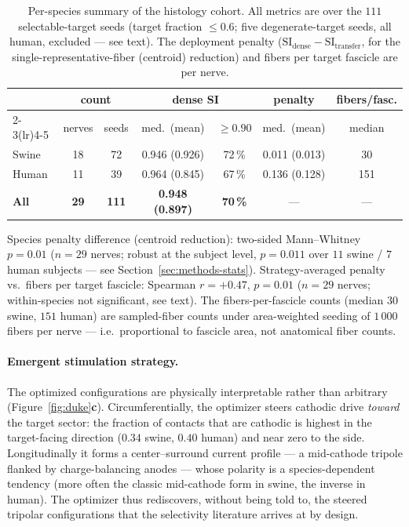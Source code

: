 \begin{table}[h]
  \centering
  \small
  \caption{Per-species summary of the histology cohort.  All metrics
    are over the $111$ selectable-target seeds (target fraction
    $\le 0.6$; five degenerate-target seeds, all human, excluded --- see
    text).  The deployment penalty
    ($\mathrm{SI_{dense}} - \mathrm{SI_{transfer}}$, for the
    single-representative-fiber (centroid) reduction) and fibers per
    target fascicle are per nerve.}
  \label{tab:duke-cohort}
  \setlength{\tabcolsep}{5pt}
  \begin{tabular}{lcccccc}
    \toprule
    & \multicolumn{2}{c}{count} & \multicolumn{2}{c}{dense SI}
    & penalty & fibers/fasc. \\
    \cmidrule(lr){2-3}\cmidrule(lr){4-5}
    & nerves & seeds & med.\ (mean) & $\ge0.90$ & med.\ (mean) & median \\
    \midrule
    Swine        & 18 &  72 & 0.946 (0.926) & 72\,\% & 0.011 (0.013) & 30 \\
    Human        & 11 &  39 & 0.964 (0.845) & 67\,\% & 0.136 (0.128) & 151 \\
    \midrule
    \textbf{All} & \textbf{29} & \textbf{111} & \textbf{0.948 (0.897)}
                 & \textbf{70\,\%} & --- & --- \\
    \bottomrule
  \end{tabular}

  \vspace{2pt}
  {\footnotesize Species penalty difference (centroid reduction):
   two-sided Mann--Whitney $p = 0.01$ ($n = 29$ nerves; robust at the
   subject level, $p = 0.011$ over $11$ swine / $7$ human subjects ---
   see Section~\ref{sec:methods-stats}).  Strategy-averaged penalty vs.\
   fibers per target fascicle: Spearman $r = +0.47$, $p = 0.01$
   ($n = 29$ nerves; within-species not significant, see text).  The
   fibers-per-fascicle counts (median $30$ swine, $151$ human) are
   sampled-fiber counts under area-weighted seeding of $1\,000$ fibers
   per nerve --- i.e.\ proportional to fascicle area, not anatomical
   fiber counts.}
\end{table}

\paragraph{Emergent stimulation strategy.}
The optimized configurations are physically interpretable rather than
arbitrary (Figure~\ref{fig:duke}\textbf{c}).  Circumferentially, the
optimizer steers cathodic drive \emph{toward} the target sector: the
fraction of contacts that are cathodic is highest in the
target-facing direction ($0.34$ swine, $0.40$ human) and near zero to
the side.  Longitudinally it forms a center--surround current profile
--- a mid-cathode tripole flanked by charge-balancing anodes ---
whose polarity is a species-dependent tendency (more often the
classic mid-cathode form in swine, the inverse in human).  The
optimizer thus rediscovers, without being told to, the steered
tripolar configurations that the selectivity literature arrives at by
design.

